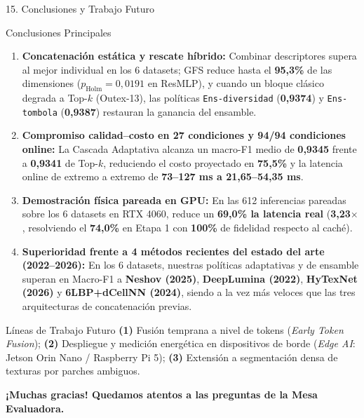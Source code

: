 \documentclass[aspectratio=169,10pt]{beamer}
\begin{document}
\begin{frame}{15. Conclusiones y Trabajo Futuro}
\begin{block}{Conclusiones Principales}
\scriptsize
\begin{enumerate}
\item \textbf{Concatenación estática y rescate híbrido:} Combinar descriptores supera al mejor individual en los 6 datasets; GFS reduce hasta el \textbf{95,3\%} de las dimensiones ($p_{\text{Holm}} = 0{,}0191$ en ResMLP), y cuando un bloque clásico degrada a Top-$k$ (Outex-13), las políticas \texttt{Ens-diversidad} (\textbf{0,9374}) y \texttt{Ens-tombola} (\textbf{0,9387}) restauran la ganancia del ensamble.
\item \textbf{Compromiso calidad--costo en 27 condiciones y 94/94 condiciones online:} La Cascada Adaptativa alcanza un macro-F1 medio de \textbf{0,9345} frente a \textbf{0,9341} de Top-$k$, reduciendo el costo proyectado en \textbf{75,5\%} y la latencia online de extremo a extremo de \textbf{73--127 ms a 21,65--54,35 ms}.
\item \textbf{Demostración física pareada en GPU:} En las 612 inferencias pareadas sobre los 6 datasets en RTX 4060, reduce un \textbf{69,0\% la latencia real} (\textbf{3,23$\times$}, resolviendo el \textbf{74,0\%} en Etapa 1 con \textbf{100\%} de fidelidad respecto al caché).
\item \textbf{Superioridad frente a 4 métodos recientes del estado del arte (2022--2026):} En los 6 datasets, nuestras políticas adaptativas y de ensamble superan en Macro-F1 a \textbf{Neshov (2025)}, \textbf{DeepLumina (2022)}, \textbf{HyTexNet (2026)} y \textbf{6LBP+dCellNN (2024)}, siendo a la vez más veloces que las tres arquitecturas de concatenación previas.
\end{enumerate}
\end{block}

\begin{exampleblock}{Líneas de Trabajo Futuro}
\scriptsize
\textbf{(1)} Fusión temprana a nivel de tokens (\emph{Early Token Fusion}); \textbf{(2)} Despliegue y medición energética en dispositivos de borde (\emph{Edge AI}: Jetson Orin Nano / Raspberry Pi 5); \textbf{(3)} Extensión a segmentación densa de texturas por parches ambiguos.
\end{exampleblock}

\centering
\textbf{\normalsize ¡Muchas gracias! Quedamos atentos a las preguntas de la Mesa Evaluadora.}
\end{frame}
\end{document}
